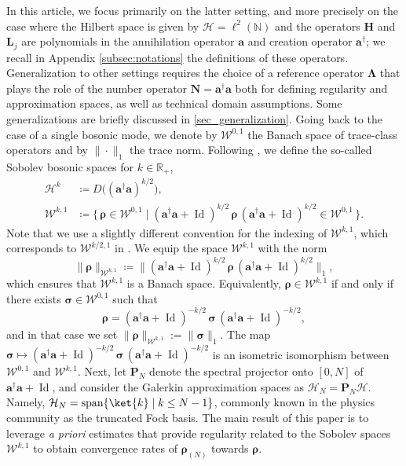 \documentclass{article}
\newcommand{\xH}{\mathcal{H}}
\newcommand{\xW}{\mathcal{W}}
\newcommand{\rN}{{\boldsymbol{\rho}_{(N)}}}
\let\bf\boldsymbol
\newcommand{\Id}{\operatorname{Id}}
\newcommand{\orho}{{\bf \rho}}
\newcommand{\oa}{{\bf a}}
\newcommand{\oL}{{\bf L}}
\newcommand{\oH}{{\bf H}}
\newcommand{\oP}{{\bf P}}
\newcommand{\oN}{{ \bf N}}
\newcommand{\oLambda}{{\bf \Lambda}}
\newcommand{\osigma}{{\bf \sigma}}
\begin{document}
In this article, we focus primarily on the latter setting, and more precisely on the case where the Hilbert space is given by $\xH = \ell^2(\mathbb{N})$ and the operators $\oH$ and $\oL_j$ are polynomials in the annihilation operator $\oa$ and creation operator $\oa^\dag$; we recall in Appendix \ref{subsec:notations} the definitions of these operators. Generalization to other settings requires the choice of a reference operator $\oLambda$ that plays the role of the number operator $\oN=\oa^\dag \oa$ both for defining regularity and approximation spaces, as well as technical domain assumptions. Some generalizations are briefly discussed in \cref{sec_generalization}.
Going back to the case of a single bosonic mode, we denote by $\xW^{0,1}$ the Banach space of trace-class operators and by $\| \cdot\|_1$ the trace norm. Following \cite{gondolfEnergyPreservingEvolutions2024}, we define the so-called Sobolev bosonic spaces for $k \in \mathbb{R}_+$,
    \begin{align}
        \label{def_Hk}
        \xH^k &\coloneqq D\big((\oa^\dag \oa)^{k/2}\big), \\
        \label{def_Wk}
        \xW^{k,1} &\coloneqq \{\,\orho\in\xW^{0,1} \;|\; (\oa^\dag \oa+\Id)^{k/2}\,\orho\,(\oa^\dag \oa+\Id)^{k/2} \in \xW^{0,1} \,\}.
    \end{align}
Note that we use a slightly different convention for the indexing of $\xW^{k,1}$, which corresponds to $\xW^{k/2,1}$ in \cite{gondolfEnergyPreservingEvolutions2024}.
We equip the space \(\xW^{k,1}\) with the norm
\[
    \|\orho\|_{\xW^{k,1}} \coloneqq \big\| (\oa^\dag \oa+\Id)^{k/2}\,\orho\,(\oa^\dag \oa+\Id)^{k/2} \big\|_1,
\]
which ensures that \(\xW^{k,1}\) is a Banach space. 
Equivalently, \(\orho\in\xW^{k,1}\) if and only if there exists \(\osigma\in\xW^{0,1}\) such that
\[
    \orho = (\oa^\dag \oa+\Id)^{-k/2}\,\osigma\,(\oa^\dag \oa+\Id)^{-k/2},
\]
and in that case we set \(\|\orho\|_{\xW^{k,1}} := \|\osigma\|_1\). The map
\(\osigma \mapsto (\oa^\dag \oa+\Id)^{-k/2}\,\osigma\,(\oa^\dag \oa+\Id)^{-k/2}\) is an isometric isomorphism between \(\xW^{0,1}\) and \(\xW^{k,1}\). Next, let $\oP_N$ denote the spectral projector onto $[0,N]$ of $\oa^\dag \oa + \Id$, and consider the Galerkin approximation spaces as $\xH_N=\oP_N\xH$. Namely, $\xH_N=\text{span}\{ \ket{k} \mid k \leq N-1\}$, commonly known in the physics community as the truncated Fock basis. The main result of this paper is to leverage \textit{a priori} estimates that provide regularity related to the Sobolev spaces $\xW^{k,1}$ to obtain convergence rates of $\rN$ towards $\orho$.
\end{document}
